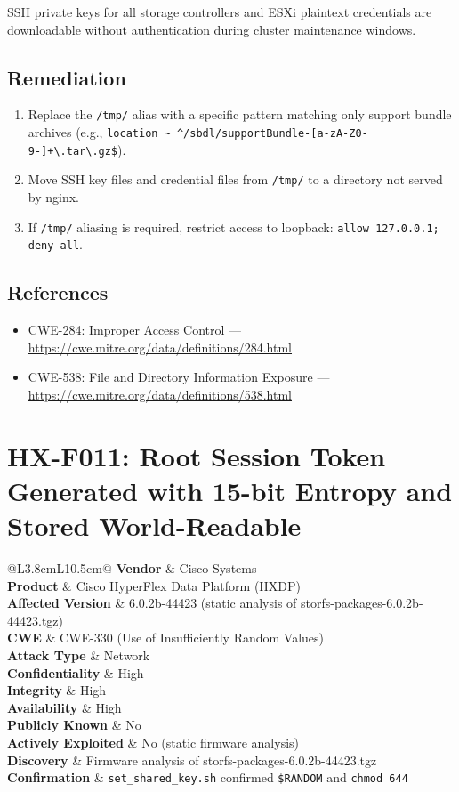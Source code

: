 \documentclass[11pt,a4paper]{article}
\makeatletter
\newcommand{\findingmeta}[9]{%
\begin{tabular}{@{}L{3.8cm}L{10.5cm}@{}}
\textbf{Vendor}             & Cisco Systems \\
\textbf{Product}            & Cisco HyperFlex Data Platform (HXDP) \\
\textbf{Affected Version}   & 6.0.2b-44423 (static analysis of storfs-packages-6.0.2b-44423.tgz) \\
\textbf{CWE}                & #1 \\
\textbf{Attack Type}        & #2 \\
\textbf{Confidentiality}    & #3 \\
\textbf{Integrity}          & #4 \\
\textbf{Availability}       & #5 \\
\textbf{Publicly Known}     & #6 \\
\textbf{Actively Exploited} & #7 \\
\textbf{Discovery}          & #8 \\
\textbf{Confirmation}       & #9 \\
\end{tabular}%
}
\makeatother
\begin{document}
SSH private keys for all storage controllers and ESXi plaintext credentials are
downloadable without authentication during cluster maintenance windows.

\subsection*{Remediation}

\begin{enumerate}[noitemsep]
\item Replace the \texttt{/tmp/} alias with a specific pattern matching only
  support bundle archives (e.g.,
  \texttt{location \textasciitilde{} \^{}/sbdl/supportBundle-[a-zA-Z0-9\textunderscore-]+\textbackslash.tar\textbackslash.gz\$}).
\item Move SSH key files and credential files from \texttt{/tmp/} to a
  directory not served by nginx.
\item If \texttt{/tmp/} aliasing is required, restrict access to loopback:
  \texttt{allow 127.0.0.1; deny all}.
\end{enumerate}

\subsection*{References}

\begin{itemize}[noitemsep]
\item CWE-284: Improper Access Control ---
  \url{https://cwe.mitre.org/data/definitions/284.html}
\item CWE-538: File and Directory Information Exposure ---
  \url{https://cwe.mitre.org/data/definitions/538.html}
\end{itemize}

\bigskip

\section{HX-F011: Root Session Token Generated with 15-bit Entropy and Stored World-Readable}

\findingmeta{CWE-330 (Use of Insufficiently Random Values)}{Network}{High}{High}{High}{No}{No (static firmware analysis)}{Firmware analysis of storfs-packages-6.0.2b-44423.tgz}{\texttt{set\_shared\_key.sh} confirmed \texttt{\$RANDOM} and \texttt{chmod 644}}
\end{document}
